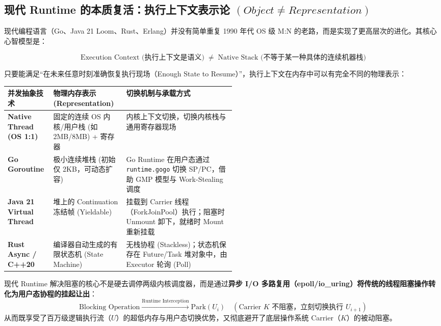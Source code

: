 \documentclass[11pt,a4paper]{ctexart}
\newcommand{\kw}[1]{\textbf{#1}}
\newcommand{\code}[1]{\texttt{#1}}
\begin{document}
\subsection{现代 Runtime 的本质复活：执行上下文表示论 \texorpdfstring{$(Object \neq Representation)$}{(Object != Representation)}}

现代编程语言（Go、Java 21 Loom、Rust、Erlang）并没有简单重复 1990 年代 OS 级 M:N 的老路，而是实现了更高层次的进化。其核心心智模型是：

\[
\boxed{\text{Execution Context (执行上下文是语义)} \;\;\neq\;\; \text{Native Stack (不等于某一种具体的连续机器栈)}}
\]

只要能满足“在未来任意时刻准确恢复执行现场（Enough State to Resume）”，执行上下文在内存中可以有完全不同的物理表示：

\begingroup
\small
\renewcommand{\arraystretch}{1.25}
\setlength{\tabcolsep}{4pt}
\begin{tabularx}{\linewidth}{>{\bfseries}p{0.20\linewidth} p{0.32\linewidth} X}
\toprule
并发抽象技术 & 物理内存表示 (Representation) & 切换机制与承载方式\\
\midrule
Native Thread (OS 1:1) & 固定的连续 OS 内核/用户栈 (如 2MB/8MB) + 寄存器 & 内核上下文切换，切换内核栈与通用寄存器现场\\
Go Goroutine & 极小连续堆栈 (初始仅 2KB，可动态扩容) & Go Runtime 在用户态通过 \code{runtime.gogo} 切换 SP/PC，借助 GMP 模型与 Work-Stealing 调度\\
Java 21 Virtual Thread & 堆上的 Continuation 冻结帧 (Yieldable) & 挂载到 Carrier 线程（ForkJoinPool）执行；阻塞时 Unmount 卸下，就绪时 Mount 重新挂载\\
Rust Async / C++20 & 编译器自动生成的有限状态机 (State Machine) & 无栈协程 (Stackless)；状态机保存在 Future/Task 堆对象中，由 Executor 轮询 (Poll)\\
\bottomrule
\end{tabularx}
\endgroup

\begin{corebox}[现代 M:N 真正做对了什么]
现代 Runtime 解决阻塞的核心不是硬去调停两级内核调度器，而是通过\kw{异步 I/O 多路复用（epoll/io\_uring）将传统的线程阻塞操作转化为用户态协程的挂起让出}：
\[
\boxed{\text{Blocking Operation} \xrightarrow{\text{Runtime Interception}} \text{Park}(U_i) \quad (\text{Carrier } K \text{ 不阻塞，立刻切换执行 } U_{i+1})}
\]
从而既享受了百万级逻辑执行流（$U$）的超低内存与用户态切换优势，又彻底避开了底层操作系统 Carrier（$K$）的被动阻塞。
\end{corebox}
\end{document}
